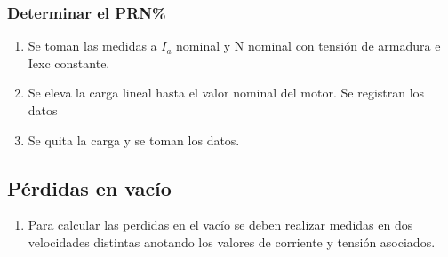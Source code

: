 \documentclass[11pt,letterpaper]{article}     %
\begin{document}
\subsubsection{Determinar el PRN\%}
\begin{enumerate}
    \item Se toman las medidas a $I_a$ nominal y N nominal con tensión de armadura e Iexc constante.
    \item Se eleva la carga lineal hasta el valor nominal del motor. Se registran los datos
    \item Se quita la carga y se toman los datos.
\end{enumerate}
\subsection{Pérdidas en vacío}
\begin{enumerate}
    \item Para calcular las perdidas en el vacío se deben realizar medidas en dos velocidades distintas anotando los valores de corriente y tensión asociados.
\end{enumerate}
\end{document}
